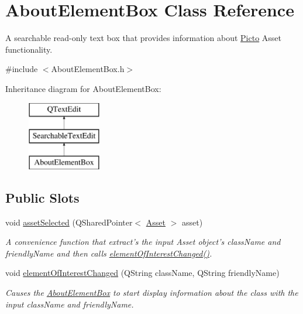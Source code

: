 \hypertarget{class_about_element_box}{\section{About\-Element\-Box Class Reference}
\label{class_about_element_box}
}


A searchable read-\/only text box that provides information about \hyperlink{namespace_picto}{Picto} Asset functionality.  




{\ttfamily \#include $<$About\-Element\-Box.\-h$>$}

Inheritance diagram for About\-Element\-Box\-:\begin{figure}[H]
\begin{center}
\leavevmode
\includegraphics[height=3.000000cm]{class_about_element_box}
\end{center}
\end{figure}
\subsection*{Public Slots}
\begin{DoxyCompactItemize}
\item 
\hypertarget{class_about_element_box_ab2ccacdf59d97cbcf1b1290ee0354269}{void \hyperlink{class_about_element_box_ab2ccacdf59d97cbcf1b1290ee0354269}{asset\-Selected} (Q\-Shared\-Pointer$<$ \hyperlink{class_picto_1_1_asset}{Asset} $>$ asset)}\label{class_about_element_box_ab2ccacdf59d97cbcf1b1290ee0354269}

\begin{DoxyCompactList}\small\item\em A convenience function that extract's the input Asset object's class\-Name and friendly\-Name and then calls \hyperlink{class_about_element_box_afea65f12eca9b738ee5861b2d518e57b}{element\-Of\-Interest\-Changed()}. \end{DoxyCompactList}\item 
void \hyperlink{class_about_element_box_afea65f12eca9b738ee5861b2d518e57b}{element\-Of\-Interest\-Changed} (Q\-String class\-Name, Q\-String friendly\-Name)
\begin{DoxyCompactList}\small\item\em Causes the \hyperlink{class_about_element_box}{About\-Element\-Box} to start display information about the class with the input class\-Name and friendly\-Name. \end{DoxyCompactList}\end{DoxyCompactItemize}
